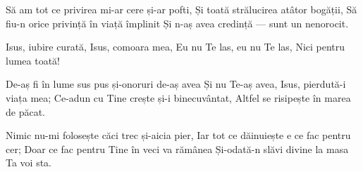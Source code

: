 \beginverse
Să am tot ce privirea mi-ar cere și-ar pofti,
Și toată strălucirea atâtor bogății,
Să fiu-n orice privință în viață împlinit
Și n-aș avea credință — sunt un nenorocit.
\endverse

\beginchorus
Isus, iubire curată,
Isus, comoara mea,
Eu nu Te las, eu nu Te las,
Nici pentru lumea toată!
\endchorus

\beginverse
De-aș fi în lume sus pus și-onoruri de-aș avea
Și nu Te-aș avea, Isus, pierdută-i viața mea;
Ce-adun cu Tine crește și-i binecuvântat,
Altfel se risipește în marea de păcat.
\endverse

\beginverse
Nimic nu-mi folosește căci trec și-aicia pier,
Iar tot ce dăinuiește e ce fac pentru cer;
Doar ce fac pentru Tine în veci va rămânea
Și-odată-n slăvi divine la masa Ta voi sta.
\endverse
\endsong